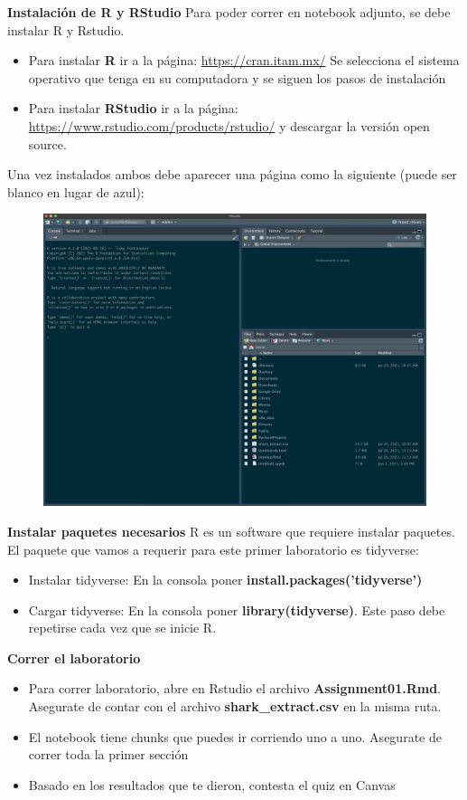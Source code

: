 \documentclass{oxmathproblems}
\begin{document}
\begin{questions}

\miquestion \textbf{Instalación de R y RStudio}
Para poder correr en notebook adjunto, se debe instalar R y Rstudio. 


\begin{itemize}
\item Para instalar \textbf{R} ir a la página: \href{https://cran.itam.mx/}{https://cran.itam.mx/} Se selecciona el sistema operativo que tenga en su computadora y se siguen los pasos de instalación 

\item Para instalar \textbf{RStudio} ir a la página: \href{https://www.rstudio.com/products/rstudio/}{https://www.rstudio.com/products/rstudio/} y descargar la versión open source. 
\end{itemize}

Una vez instalados ambos debe aparecer una página como la siguiente (puede ser blanco en lugar de azul): 

\begin{figure}[!ht]
  \includegraphics[width=.5\linewidth]{img1.png}
  \label{fig:boat1}
  \centering
\end{figure}

\miquestion \textbf{Instalar paquetes necesarios}
R es un software que requiere instalar paquetes. El paquete que vamos a requerir para este primer laboratorio es tidyverse:

\begin{itemize}
\item Instalar tidyverse: En la consola poner \textbf{install.packages('tidyverse')}
\item Cargar tidyverse: En la consola poner \textbf{library(tidyverse)}. Este paso debe repetirse cada vez que se inicie R.
\end{itemize}


\miquestion \textbf{Correr el laboratorio}

\begin{itemize}
\item Para correr laboratorio, abre en Rstudio el archivo \textbf{Assignment01.Rmd}. Asegurate de contar con el archivo \textbf{shark\_extract.csv} en la misma ruta.
\item El notebook tiene chunks que puedes ir corriendo uno a uno. Asegurate de correr toda la primer sección
\item Basado en los resultados que te dieron, contesta el  quiz en Canvas
\end{itemize}

\end{questions}
\end{document}

